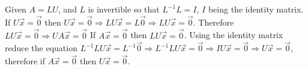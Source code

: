 	Given $A=LU$, and $L$ is invertible so that $L^{-1}L=I$, $I$ being the identity matrix. If $U\vec{x}=\vec{0}$ then $U\vec{x}=\vec{0} \Rightarrow LU\vec{x}=L\vec{0} \Rightarrow LU\vec{x}=\vec{0}$. Therefore $LU\vec{x}=\vec{0} \Rightarrow UA\vec{x}=\vec{0}$
		If $A\vec{x}=\vec{0}$ then $LU\vec{x}=\vec{0}$. Using the identity matrix reduce the equation $L^{-1}LU\vec{x}=L^{-1}\vec{0} \Rightarrow L^{-1}LU\vec{x}=\vec{0} \Rightarrow IU\vec{x}=\vec{0} \Rightarrow U\vec{x}=\vec{0}$, therefore if $A\vec{x}=\vec{0}$ then $U\vec{x}=\vec{0}$.
